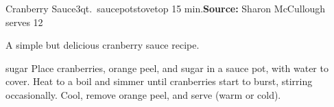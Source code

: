 \begin{recipe}{Cranberry Sauce}{3qt.\ saucepot\hfill stovetop \hfill 15 min.}{\textbf{Source:} Sharon McCullough \hfill serves 12}

 \freeform A simple but delicious cranberry sauce recipe.

  {sugar}
 Place cranberries, orange peel, and sugar in a sauce pot, with water to cover.
 \newstep Heat to a boil and simmer until cranberries start to burst, stirring occasionally.
 \newstep Cool, remove orange peel, and serve (warm or cold).

\end{recipe}
